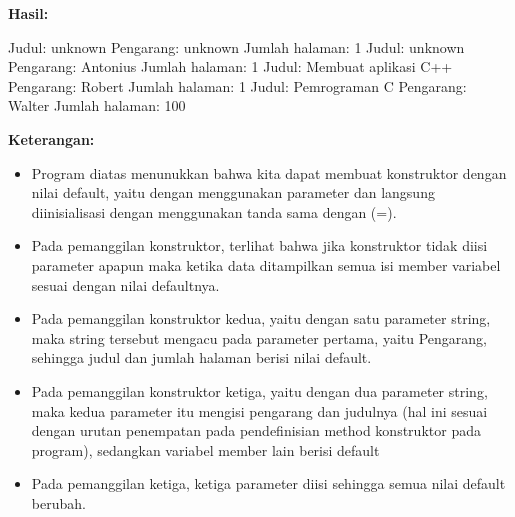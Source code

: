 \textbf{Hasil:}

\begin{lcverbatim}
Judul: unknown
Pengarang: unknown
Jumlah halaman: 1
Judul: unknown
Pengarang: Antonius
Jumlah halaman: 1
Judul: Membuat aplikasi C++
Pengarang: Robert
Jumlah halaman: 1
Judul: Pemrograman C
Pengarang: Walter
Jumlah halaman: 100
\end{lcverbatim}
\textbf{Keterangan:}

\begin{itemize}

\item
  Program diatas menunukkan bahwa kita dapat membuat konstruktor dengan
  nilai default, yaitu dengan menggunakan parameter dan langsung
  diinisialisasi dengan menggunakan tanda sama dengan (=).
\item
  Pada pemanggilan konstruktor, terlihat bahwa jika konstruktor tidak
  diisi parameter apapun maka ketika data ditampilkan semua isi member
  variabel sesuai dengan nilai defaultnya.
\item
  Pada pemanggilan konstruktor kedua, yaitu dengan satu parameter
  string, maka string tersebut mengacu pada parameter pertama, yaitu
  Pengarang, sehingga judul dan jumlah halaman berisi nilai default.
\item
  Pada pemanggilan konstruktor ketiga, yaitu dengan dua parameter
  string, maka kedua parameter itu mengisi pengarang dan judulnya (hal
  ini sesuai dengan urutan penempatan pada pendefinisian method
  konstruktor pada program), sedangkan variabel member lain berisi
  default
\item
  Pada pemanggilan ketiga, ketiga parameter diisi sehingga semua nilai
  default berubah.
\end{itemize}
